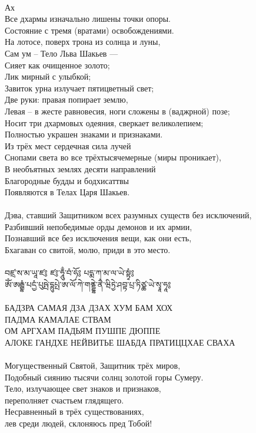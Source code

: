 \\
Ах\\
Все дхармы изначально лишены точки опоры.\\
Состояние с тремя (вратами) освобождениями.\\
На лотосе, поверх трона из солнца и луны,\\
Сам ум – Тело Льва Шакьев — \\
Сияет как очищенное золото;\\
Лик мирный с улыбкой;\\
Завиток урна излучает пятицветный свет;\\
Две руки: правая попирает землю,\\
Левая – в жесте равновесия, ноги сложены в (ваджрной) позе;\\
Носит три дхармовых одеяния, сверкает великолепием;\\
Полностью украшен знаками и признаками.\\
Из трёх мест сердечная сила лучей \\
Снопами света во все трёхтысячемерные (миры проникает),\\
В необъятных землях десяти направлений\\
Благородные будды и бодхисаттвы\\
Появляются в Телах Царя Шакьев.\\
\newpage
{}
\\
Дэва, ставший Защитником всех разумных существ без исключений,\\
Разбивший непобедимые орды демонов и их армии,\\
Познавший все без исключения вещи, как они есть,\\
Бхагаван со свитой, молю, приди в это место.\\
\ti
\\
བཛྲ་ས་མ་ཡཱ་ཛ༔ ཛ༔་ཧཱུྃ་བཾ་ཧོ༔ པདྨ་ཀ་མ་ལ་ཡེ་སྟྭཾ༔\\
ཨོཾ་ཨརྒྷཾ་པདྱཾ་པུཥྤེ་དྷུཔྤེ་ཨ་ལོ་ཀེ་གནྡྷེ་ནཻ་ཝིཏྱེ་ཤབྟ་པྲ་ཏིཙྪ་ཡེ་སྭཱ་ཧཱ༔\\
\ru
\\
БАДЗРА САМАЯ ДЗА ДЗАХ ХУМ БАМ ХОХ \\
ПАДМА КАМАЛАЕ СТВАМ\\
ОМ АРГХАМ ПАДЬЯМ ПУШПЕ ДЮППЕ\\
АЛОКЕ ГАНДХЕ НЕЙВИТЬЕ ШАБДА ПРАТИЦЦХАЕ СВАХА\\
\\
Могущественный Святой, Защитник трёх миров,\\
Подобный сиянию тысячи солнц золотой горы Сумеру.\\
Тело, излучающее свет знаков и признаков, \\ \indent переполняет счастьем глядящего.\\
Несравненный в трёх существованиях, \\ \indent лев среди людей, склоняюсь пред Тобой!


